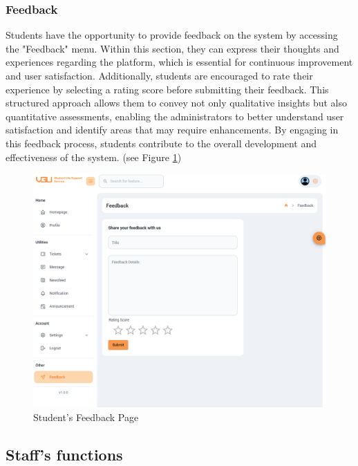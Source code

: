 	\subsubsection{Feedback}
	Students have the opportunity to provide feedback on the system by accessing the "Feedback" menu. Within this section, they can express their thoughts and experiences regarding the platform, which is essential for continuous improvement and user satisfaction. Additionally, students are encouraged to rate their experience by selecting a rating score before submitting their feedback. This structured approach allows them to convey not only qualitative insights but also quantitative assessments, enabling the administrators to better understand user satisfaction and identify areas that may require enhancements. By engaging in this feedback process, students contribute to the overall development and effectiveness of the system. (see Figure \ref{fig:gui-std-feedback})
	\begin{figure}[H]
		\centering
		\includegraphics[width=1.0\linewidth]{graphics/gui/student/feedback}
		\caption{Student's Feedback Page}
		\label{fig:gui-std-feedback}
	\end{figure}
	
	
\subsection{Staff's functions}

